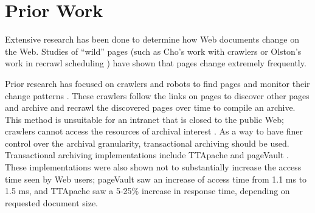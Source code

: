 \documentclass[runningheads,a4paper]{llncs}
\begin{document}

\section{Prior Work}
\label{priorwork}
\vskip -3mm
Extensive research has been done to determine how Web documents change on the Web.  Studies of ``wild'' pages (such as Cho's work with crawlers \cite{cho2000evolution} or Olston's work in recrawl scheduling \cite{olston2008recrawl}) have shown that pages change extremely frequently.  

Prior research has focused on crawlers and robots to find pages and monitor their change patterns \cite{brewington2000keeping, fetterly2004large, 511465}.  These crawlers follow the links on pages to discover other pages and archive and recrawl the discovered pages over time to compile an archive.  This method is unsuitable for an intranet that is closed to the public Web; crawlers cannot access the resources of archival interest \cite{hiddenurls}.  As a way to have finer control over the archival granularity, transactional archiving should be used. Transactional archiving implementations include TTApache \cite{Dyreson:2004:MVW:988672.988730} and pageVault \cite{transarch}.  
These implementations were also shown not to substantially increase the access time seen by Web users; pageVault saw an increase of access time from 1.1 ms to 1.5 ms, and TTApache saw a 5-25\% increase in response time, depending on requested document size.
\end{document}
